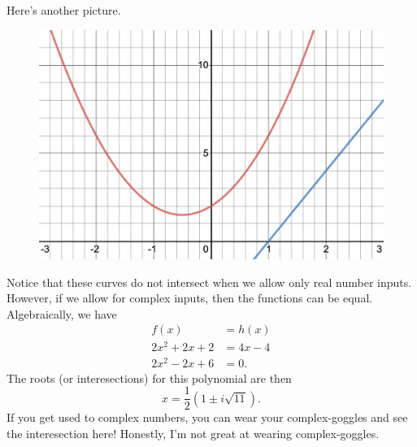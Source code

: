\documentclass[12pt]{article} %
\begin{document}
\begin{solution}
Here's another picture.
\begin{figure}[H]
    \centering
    \includegraphics[width=.8\textwidth]{desmos-graph(2).png}
\end{figure}
Notice that these curves do not intersect when we allow only real number inputs. However, if we allow for complex inputs, then the functions can be equal. Algebraically, we have
\begin{align*}
    f(x)&=h(x)\\
    2x^2+2x+2&= 4x-4\\
    2x^2-2x+6&=0.
\end{align*}
The roots (or interesections) for this polynomial are then
\[
x=\frac{1}{2}\left( 1 \pm i \sqrt{11}\right).
\]
If you get used to complex numbers, you can wear your complex-goggles and see the interesection here! Honestly, I'm not great at wearing complex-goggles.
\end{solution}
\end{document}

